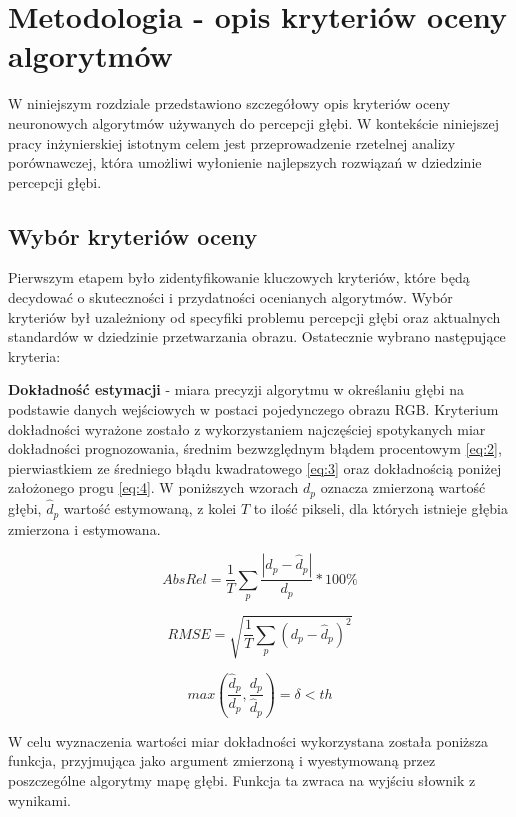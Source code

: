 \chapter{Metodologia - opis kryteriów oceny algorytmów}\label{chap:metodologia}

W niniejszym rozdziale przedstawiono szczegółowy opis kryteriów oceny neuronowych algorytmów używanych do percepcji głębi. W kontekście niniejszej pracy inżynierskiej istotnym celem jest przeprowadzenie rzetelnej analizy porównawczej, która umożliwi wyłonienie najlepszych rozwiązań w dziedzinie percepcji głębi.

\section{Wybór kryteriów oceny}
Pierwszym etapem było zidentyfikowanie kluczowych kryteriów, które będą decydować o skuteczności i przydatności ocenianych algorytmów. Wybór kryteriów był uzależniony od specyfiki problemu percepcji głębi oraz aktualnych standardów w dziedzinie przetwarzania obrazu. Ostatecznie wybrano następujące kryteria:

\textbf{Dokładność estymacji} - miara precyzji algorytmu w określaniu głębi na podstawie danych wejściowych w postaci pojedynczego obrazu RGB. Kryterium dokładności wyrażone zostało z wykorzystaniem najczęściej spotykanych miar dokładności prognozowania, średnim bezwzględnym błądem procentowym \ref{eq:2}, pierwiastkiem ze średniego błądu kwadratowego \ref{eq:3} oraz dokładnością poniżej założonego progu \ref{eq:4}. W poniższych wzorach $ d_p $ oznacza zmierzoną wartość głębi, $ \hat{d}_p $ wartość estymowaną, z kolei $ T $ to ilość pikseli, dla których istnieje głębia zmierzona i estymowana.

\begin{equation} \label{eq:2}
    AbsRel = \frac{1}{T} \sum_{p} \frac{|d_p - \hat{d}_p|}{d_p} * 100\%
\end{equation}

\begin{equation} \label{eq:3}
    RMSE = \sqrt{\frac{1}{T} \sum_{p} (d_p - \hat{d}_p)^2}
\end{equation}

\begin{equation} \label{eq:4}
    max(\frac{\hat{d}_p}{d_p}, \frac{d_p}{\hat{d}_p}) = \delta < th
\end{equation}

W celu wyznaczenia wartości miar dokładności wykorzystana została poniższa funkcja, przyjmująca jako argument zmierzoną i wyestymowaną przez poszczególne algorytmy mapę głębi. Funkcja ta zwraca na wyjściu słownik z wynikami.

